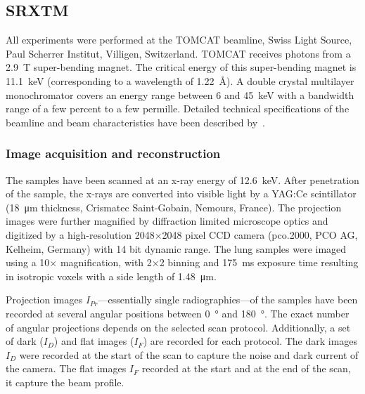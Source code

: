 \subsection{SRXTM}%
All experiments were performed at the TOMCAT beamline, Swiss Light Source, Paul Scherrer Institut, Villigen, Switzerland. %
TOMCAT receives photons from a \SI{2.9}{\tesla} super-bending magnet. The critical energy of this super-bending magnet is \SI{11.1}{\kilo\electronvolt} (corresponding to a wavelength of \SI{1.22}{\angstrom}). A double crystal multilayer monochromator covers an energy range between 6 and \SI{45}{\kilo\electronvolt} with a bandwidth range of a few percent to a few permille. Detailed technical specifications of the beamline and beam characteristics have been described by~.

\subsubsection{Image acquisition and reconstruction}%
\label{seq:Image Acquisition}%
The samples have been scanned at an x-ray energy of \SI{12.6}{\kilo\electronvolt}. After penetration of the sample, the x-rays are converted into visible light by a YAG:Ce scintillator (\SI{18}{\micro\meter} thickness, Crismatec Saint-Gobain, Nemours, France). The projection images were further magnified by diffraction limited microscope optics and digitized by a high-resolution 2048$\times$2048 pixel CCD camera (pco.2000, PCO AG, Kelheim, Germany) with 14 bit dynamic range. %
The lung samples were imaged using a 10$\times$ magnification, with 2$\times$2 binning and \SI{175}{\milli\second} exposure time resulting in isotropic voxels with a side length of \SI{1.48}{\micro\meter}.

Projection images $I_{Pr}$---essentially single radiographies---of the samples have been recorded at several angular positions between \SI{0}{\degree} and \SI{180}{\degree}. The exact number of angular projections depends on the selected scan protocol. Additionally, a set of dark ($I_{D}$) and flat images ($I_{F}$) are recorded for each protocol. The dark images $I_{D}$ were recorded at the start of the scan to capture the noise and dark current of the camera. The flat images $I_{F}$ recorded at the start and at the end of the scan, it capture the beam profile.

